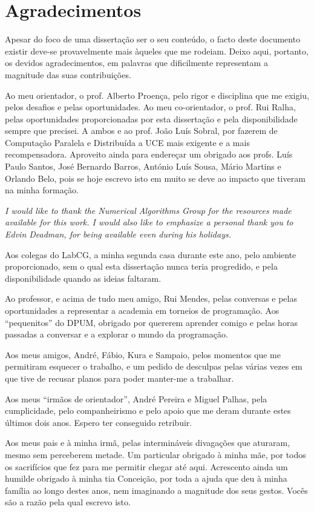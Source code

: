 \documentclass[../extabst]{subfiles}
\begin{document}
	\chapter*{Agradecimentos}
	Apesar do foco de uma dissertação ser o seu conteúdo, o facto deste documento existir deve-se provavelmente mais àqueles que me rodeiam. Deixo aqui, portanto, os devidos agradecimentos, em palavras que dificilmente representam a magnitude das suas contribuições.

	Ao meu orientador, o prof. Alberto Proença, pelo rigor e disciplina que me exigiu, pelos desafios e pelas oportunidades. Ao meu co-orientador, o prof. Rui Ralha, pelas oportunidades proporcionadas por esta dissertação e pela disponibilidade sempre que precisei. A ambos e ao prof. João Luís Sobral, por fazerem de Computação Paralela e Distribuída a UCE mais exigente e a mais recompensadora. Aproveito ainda para endereçar um obrigado aos profs. Luís Paulo Santos, José Bernardo Barros, António Luís Sousa, Mário Martins e Orlando Belo, pois se hoje escrevo isto em muito se deve ao impacto que tiveram na minha formação.

	{\itshape
	I would like to thank the Numerical Algorithms Group for the resources made available for this work. I would also like to emphasize a personal thank you to Edvin Deadman, for being available even during his holidays.
	}

	Aos colegas do LabCG, a minha segunda casa durante este ano, pelo ambiente proporcionado, sem o qual esta dissertação nunca teria progredido, e pela disponibilidade quando as ideias faltaram.

	Ao professor, e acima de tudo meu amigo, Rui Mendes, pelas conversas e pelas oportunidades a representar a academia em torneios de programação. Aos ``pequenitos'' do DPUM, obrigado por quererem aprender comigo e pelas horas passadas a conversar e a explorar o mundo da programação.

	Aos meus amigos, André, Fábio, Kura e Sampaio, pelos momentos que me permitiram esquecer o trabalho, e um pedido de desculpas pelas várias vezes em que tive de recusar planos para poder manter-me a trabalhar.

	Aos meus ``irmãos de orientador'', André Pereira e Miguel Palhas, pela cumplicidade, pelo companheirismo e pelo apoio que me deram durante estes últimos dois anos. Espero ter conseguido retribuir.

	Aos meus pais e à minha irmã, pelas intermináveis divagações que aturaram, mesmo sem perceberem metade. Um particular obrigado à minha mãe, por todos os sacrifícios que fez para me permitir chegar até aqui. Acrescento ainda um humilde obrigado à minha tia Conceição, por toda a ajuda que deu à minha família ao longo destes anos, nem imaginando a magnitude dos seus gestos. Vocês são a razão pela qual escrevo isto.
\end{document}
